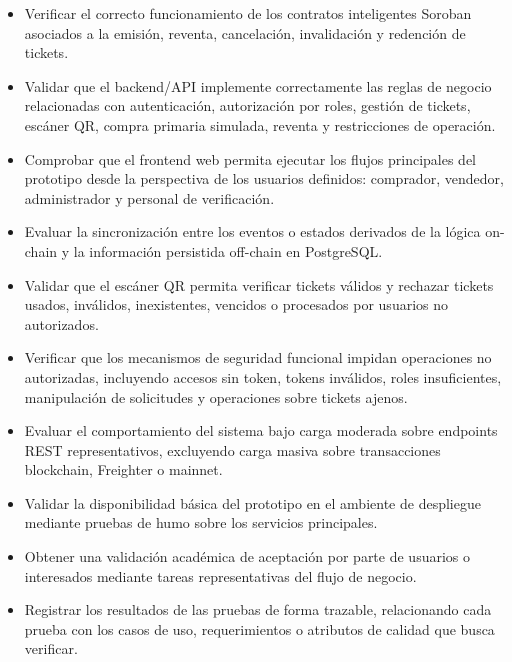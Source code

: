 \documentclass[12pt,letterpaper]{article}
\begin{document}
\begin{itemize}
    \item Verificar el correcto funcionamiento de los contratos inteligentes Soroban asociados a la emisión, reventa, cancelación, invalidación y redención de tickets.

    \item Validar que el backend/API implemente correctamente las reglas de negocio relacionadas con autenticación, autorización por roles, gestión de tickets, escáner QR, compra primaria simulada, reventa y restricciones de operación.

    \item Comprobar que el frontend web permita ejecutar los flujos principales del prototipo desde la perspectiva de los usuarios definidos: comprador, vendedor, administrador y personal de verificación.

    \item Evaluar la sincronización entre los eventos o estados derivados de la lógica on-chain y la información persistida off-chain en PostgreSQL.

    \item Validar que el escáner QR permita verificar tickets válidos y rechazar tickets usados, inválidos, inexistentes, vencidos o procesados por usuarios no autorizados.

    \item Verificar que los mecanismos de seguridad funcional impidan operaciones no autorizadas, incluyendo accesos sin token, tokens inválidos, roles insuficientes, manipulación de solicitudes y operaciones sobre tickets ajenos.

    \item Evaluar el comportamiento del sistema bajo carga moderada sobre endpoints REST representativos, excluyendo carga masiva sobre transacciones blockchain, Freighter o mainnet.

    \item Validar la disponibilidad básica del prototipo en el ambiente de despliegue mediante pruebas de humo sobre los servicios principales.

    \item Obtener una validación académica de aceptación por parte de usuarios o interesados mediante tareas representativas del flujo de negocio.

    \item Registrar los resultados de las pruebas de forma trazable, relacionando cada prueba con los casos de uso, requerimientos o atributos de calidad que busca verificar.
\end{itemize}
\end{document}
